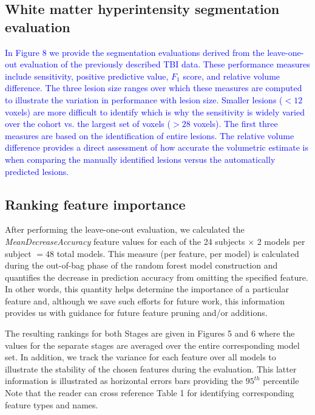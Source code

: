 \documentclass[11pt,]{article}
\begin{document}
\subsection{White matter hyperintensity segmentation
evaluation}\label{white-matter-hyperintensity-segmentation-evaluation}

\textcolor{blue}{In Figure 8 we provide the segmentation evaluations derived from the leave-one-out evaluation
of the previously described TBI data.  These performance measures include sensitivity,
positive predictive value, $F_1$ score, and relative volume difference.  The three lesion
size ranges over which these measures are computed to illustrate the variation
in performance with lesion size.  Smaller lesions ($< 12$ voxels) are more difficult
to identify which is why the sensitivity is widely varied over the cohort vs. the largest
set of voxels ($> 28$ voxels).   The first three measures are based on the identification of
entire lesions.  The relative volume difference provides a direct assessment of how accurate
the volumetric estimate is when comparing the manually identified lesions versus the
automatically predicted lesions.}

\subsection{Ranking feature
importance}\label{ranking-feature-importance}

After performing the leave-one-out evaluation, we calculated the
\emph{MeanDecreaseAccuracy} feature values for each of the 24 subjects
\(\times\) 2 models per subject \(=48\) total models. This measure (per
feature, per model) is calculated during the out-of-bag phase of the
random forest model construction and quantifies the decrease in
prediction accuracy from omitting the specified feature. In other words,
this quantity helps determine the importance of a particular feature
and, although we save such efforts for future work, this information
provides us with guidance for future feature pruning and/or additions.

The resulting rankings for both Stages are given in Figures 5 and 6
where the values for the separate stages are averaged over the entire
corresponding model set. In addition, we track the variance for each
feature over all models to illustrate the stability of the chosen
features during the evaluation. This latter information is illustrated
as horizontal errors bars providing the \(95^{th}\) percentile Note that
the reader can cross reference Table 1 for identifying corresponding
feature types and names.
\end{document}
